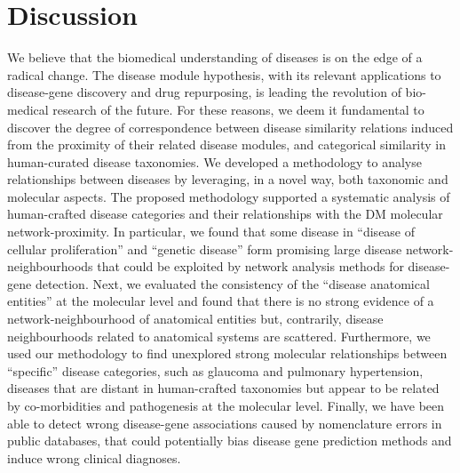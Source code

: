 \documentclass[journal,twoside,web]{ieeecolor}
\begin{document}
\vspace{-9pt}
\section{Discussion}
\label{discussion}
We believe that the biomedical understanding of diseases is on the edge of a radical change. The disease module hypothesis, with its relevant applications to disease-gene discovery and drug repurposing, is leading the revolution of bio-medical research of the future. For these reasons, we deem it fundamental to discover the degree of correspondence between disease similarity relations induced from the proximity of their related disease modules, and categorical similarity in  human-curated disease taxonomies. 
We developed a methodology  to analyse relationships between diseases by leveraging, in a novel way, both taxonomic and molecular aspects. 
The proposed methodology supported a systematic analysis of human-crafted disease categories and their relationships with the DM molecular network-proximity. In particular, we found that some disease in ``disease of cellular proliferation'' and ``genetic disease'' form promising large disease network-neighbourhoods that could be exploited by network  analysis methods for disease-gene detection. Next, we evaluated the consistency of the ``disease anatomical entities'' at the molecular level and found that there is no  strong evidence of a network-neighbourhood of anatomical entities but, contrarily,  disease neighbourhoods related to anatomical systems are scattered. Furthermore, we used our methodology to find unexplored strong molecular relationships between ``specific'' disease categories, such as glaucoma and pulmonary hypertension,  diseases that are distant in human-crafted taxonomies but appear to be  related by co-morbidities and pathogenesis at the molecular level. Finally, we have been able to detect wrong disease-gene associations caused by nomenclature errors in public databases, that could potentially bias disease gene prediction methods and induce wrong clinical diagnoses.\\
\vspace{-9pt}
\end{document}
